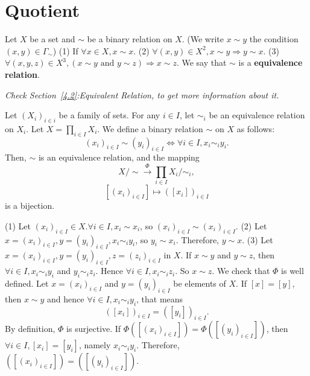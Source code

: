 \section{Quotient}\label{5.5}
\begin{definitionenv}
    Let $X$ be a set and $\sim$ be a binary relation on $X$. (We write $x\sim y$ the condition $(x, y)\in \Gamma_\sim$)
    \newline
    (1) If $\forall x\in X,  x\sim x$.
    \newline
    (2) $\forall (x, y)\in X^2,  x\sim y\Rightarrow y\sim x$.
    \newline
    (3) $\forall (x, y, z)\in X^3,  (x\sim y \text{ and } y\sim z )\Rightarrow x\sim z$.
    \newline
    We say that $\sim $ is a \textbf{equivalence relation}.
\end{definitionenv}
\textit{Check Section~\ref{4.2}:Equivalent Relation,  to get more information about it.}
\begin{propositionenv}
    Let $(X_i)_{i\in i}$ be a family of sets. For any $i\in I$,  let $\sim_i$ be an equivalence relation on $X_i$. Let $X=\prod_{i\in I}X_i$. We define a binary relation $\sim$ on $X$ as follows:
    $$(x_i)_{i\in I}\sim (y_i)_{i\in I}\Leftrightarrow \forall i\in I,  x_i\sim_i y_i.$$
    Then,  $\sim $ is an equivalence relation,  and the mapping
    $$X/\sim \overset{\Phi}{\longrightarrow }\prod_{i\in I}X_i/\sim_i, $$
    $$ [(x_i)_{i\in I}]\longmapsto  ([x_i])_{i\in I}$$
    is a bijection.
\end{propositionenv}
\begin{proofenv}
    \quad
    \newline
    (1) Let $(x_i)_{i\in I}\in X. \forall i\in I, x_i\sim x_i$,  so $(x_i)_{i\in I}\sim(x_i)_{i\in I}$.
    \newline
    (2) Let $x=(x_i)_{i\in I}, y=(y_i)_{i\in I},  x_i\sim_i y_i$,  so $y_i\sim x_i$. Therefore,  $y\sim x$.
    \newline 
    (3) Let $x=(x_i)_{i\in I}, y=(y_i)_{i\in I}, z=(z_i)_{i\in I}$ in $X$. If $x\sim y$ and $y\sim z$,  then $\forall i \in I, x_i\sim_i y_i$ and $y_i\sim_i z_i$. Hence $\forall i \in I,  x_i\sim_i z_i$. So $x\sim z$.
    \newline
    We check that $\Phi$ is well defined. Let $x=(x_i)_{i\in I}$ and $y=(y_i)_{i\in I}$ be elements of $X$. If $[x]=[y]$,  then $x\sim y$ and hence $\forall i\in I,  x_i\sim_i y_i$,  that means 
    $$([x_i])_{i\in I}=([y_i])_{i\in I}.$$
    By definition,  $\Phi$ is surjective. If $\Phi([(x_i)_{i\in I}])=\Phi([(y_i)_{i\in I}])$,  then $\forall i\in I,  [x_i]=[y_i]$,  namely $x_i\sim_i y_i$. Therefore,  $([(x_i)_{i\in I}])=([(y_i)_{i\in I}])$.
\end{proofenv}
